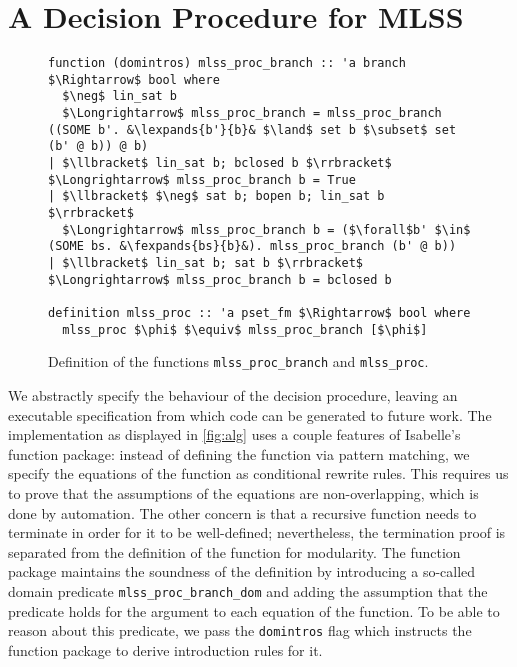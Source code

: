 \documentclass[sigplan,10pt,anonymous,review]{acmart}
\newcommand{\lefttrianglebar}{\mathrel{\tikz[baseline]{\draw (1ex, 0.75ex) -- (0, 1.25ex) -- (0, 0.25ex) -- cycle; \draw (0, 0.75ex) -- (1ex, 0.75ex);}}}
\newcommand{\lefttriangle}{\mathrel{\tikz[baseline]{\draw (1ex, 0.75ex) -- (0, 1.25ex) -- (0, 0.25ex) -- cycle;}}}
\newcommand{\lexpands}[2]{#1 $\lefttriangle$ #2}
\newcommand{\fexpands}[2]{#1 $\lefttrianglebar$ #2}
\begin{document}
\section{A Decision Procedure for MLSS}
\begin{figure*}
  \centering
\begin{lstlisting}
function (domintros) mlss_proc_branch :: 'a branch $\Rightarrow$ bool where
  $\neg$ lin_sat b
  $\Longrightarrow$ mlss_proc_branch = mlss_proc_branch ((SOME b'. &\lexpands{b'}{b}& $\land$ set b $\subset$ set (b' @ b)) @ b)
| $\llbracket$ lin_sat b; bclosed b $\rrbracket$ $\Longrightarrow$ mlss_proc_branch b = True
| $\llbracket$ $\neg$ sat b; bopen b; lin_sat b $\rrbracket$
  $\Longrightarrow$ mlss_proc_branch b = ($\forall$b' $\in$ (SOME bs. &\fexpands{bs}{b}&). mlss_proc_branch (b' @ b))
| $\llbracket$ lin_sat b; sat b $\rrbracket$ $\Longrightarrow$ mlss_proc_branch b = bclosed b

definition mlss_proc :: 'a pset_fm $\Rightarrow$ bool where
  mlss_proc $\phi$ $\equiv$ mlss_proc_branch [$\phi$]
\end{lstlisting}
\caption{Definition of the functions \lstinline|mlss_proc_branch| and \lstinline|mlss_proc|.\label{fig:alg}}
\end{figure*}

\noindent We abstractly specify the behaviour of the decision procedure, leaving an executable specification from which code can be generated to future work.
The implementation as displayed in \autoref{fig:alg} uses a couple features of Isabelle's function package:
instead of defining the function via pattern matching, we specify the equations of the function as conditional rewrite rules.
This requires us to prove that the assumptions of the equations are non-overlapping, which is done by automation.
The other concern is that a recursive function needs to terminate in order for it to be well-defined;
nevertheless, the termination proof is separated from the definition of the function for modularity.
The function package maintains the soundness of the definition by introducing a so-called domain predicate \lstinline!mlss_proc_branch_dom! and adding the assumption that the predicate holds for the argument to each equation of the function.
To be able to reason about this predicate, we pass the \lstinline!domintros! flag which instructs the function package to derive introduction rules for it.
\end{document}
